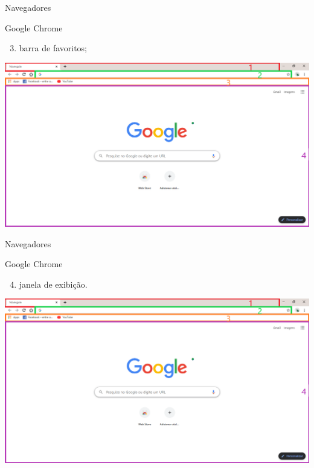 \begin{frame}{Navegadores}
	\begin{block}{Google Chrome}
		\begin{enumerate}
			\setcounter{enumi}{2}
			\item barra de favoritos;
		\end{enumerate}
	\end{block}
	
	\centering
	\includegraphics[width=0.9\linewidth]{Figuras/Ch03/fig8.6}
\end{frame}


\begin{frame}{Navegadores}
	\begin{block}{Google Chrome}
		\begin{enumerate}
			\setcounter{enumi}{3}
			\item janela de exibição.
		\end{enumerate}
	\end{block}
	
	\centering
	\includegraphics[width=0.9\linewidth]{Figuras/Ch03/fig8.6}
\end{frame}


